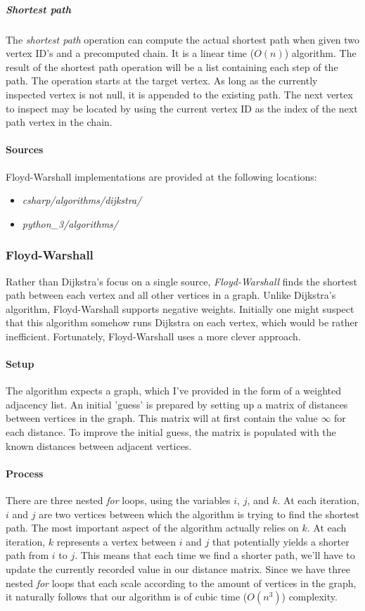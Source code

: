 \documentclass{article}
\begin{document}
\subparagraph{Shortest path}
The {\em shortest path} operation can compute the actual shortest path when given two vertex ID's and a precomputed
chain. It is a linear time (\(O(n)\)) algorithm. The result of the shortest path operation will be a list containing
each step of the path. The operation starts at the target vertex. As long as the currently inspected vertex is not
null, it is appended to the existing path. The next vertex to inspect may be located by using the current vertex ID
as the index of the next path vertex in the chain.

\paragraph{Sources}
Floyd-Warshall implementations are provided at the following locations:
\begin{itemize}
\item{{\em csharp/algorithms/dijkstra/}}
\item{{\em python\_3/algorithms/}}
\end{itemize}


\subsubsection{Floyd-Warshall}
Rather than Dijkstra's focus on a single source, {\em Floyd-Warshall} finds the shortest path between each vertex
and all other vertices in a graph. Unlike Dijkstra's algorithm, Floyd-Warshall supports negative weights.
Initially one might suspect that this algorithm somehow runs Dijkstra on each vertex, which would be rather
inefficient. Fortunately, Floyd-Warshall uses a more clever approach.

\paragraph{Setup}
The algorithm expects a graph, which I've provided in the form of a weighted adjacency list. An initial 'guess' is
prepared by setting up a matrix of distances between vertices in the graph. This matrix will at first contain the
value \(\infty\) for each distance. To improve the initial guess, the matrix is populated with the known distances
between adjacent vertices.

\paragraph{Process}
There are three nested {\em for} loops, using the variables \(i\), \(j\), and \(k\). At each iteration,
\(i\) and \(j\) are two vertices between which the algorithm is trying to find the shortest path. The most important
aspect of the algorithm actually relies on \(k\). At each iteration, \(k\) represents a vertex between \(i\) and
\(j\) that potentially yields a shorter path from \(i\) to \(j\). This means that each time we find a shorter path,
we'll have to update the currently recorded value in our distance matrix. Since we have three nested {\em for} loops
that each scale according to the amount of vertices in the graph, it naturally follows that our algorithm is of
cubic time (\(O(n^3)\)) complexity.
\end{document}
